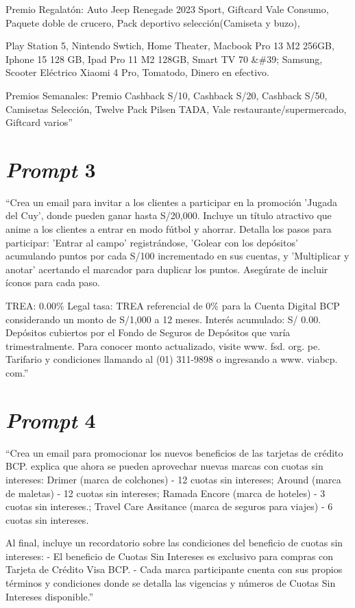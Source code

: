 Premio Regalatón:
Auto Jeep Renegade 2023 Sport,
Giftcard Vale Consumo,
Paquete doble de crucero,
Pack deportivo selección(Camiseta y buzo),

Play Station 5,
Nintendo Swtich,
Home Theater,
Macbook Pro 13 M2 256GB,
Iphone 15 128 GB,
Ipad Pro 11 M2 128GB,
Smart TV 70 \&\#39; Samsung,
Scooter Eléctrico Xiaomi 4 Pro,
Tomatodo,
Dinero en efectivo.

Premios Semanales:
Premio
Cashback S/10,
Cashback S/20,
Cashback S/50,
Camisetas Selección,
Twelve Pack Pilsen TADA,
Vale restaurante/supermercado,
Giftcard varios''


\section{\textit{Prompt} 3}

``Crea un email para invitar a los clientes a participar en la promoción 'Jugada del Cuy', donde pueden ganar hasta S/20,000.  Incluye un título atractivo que anime a los clientes a entrar en modo fútbol y ahorrar. Detalla los pasos para participar: 'Entrar al campo' registrándose, 'Golear con los depósitos' acumulando puntos por cada S/100 incrementado en sus cuentas, y 'Multiplicar y anotar' acertando el marcador para duplicar los puntos. Asegúrate de incluir íconos para cada paso.

TREA: 0.00\%
Legal tasa: TREA referencial de 0\% para la Cuenta Digital BCP considerando un monto de S/1,000 a 12 meses. Interés acumulado: S/ 0.00. Depósitos cubiertos por el Fondo de Seguros de Depósitos que varía trimestralmente. Para conocer monto actualizado, visite www. fsd. org. pe. Tarifario y condiciones llamando al (01) 311-9898 o ingresando a www. viabcp. com.''

\section{\textit{Prompt} 4}

``Crea un email para promocionar los nuevos beneficios de las tarjetas de crédito BCP. explica que ahora se pueden aprovechar nuevas marcas con cuotas sin intereses: Drimer (marca de colchones) - 12 cuotas sin intereses; Around (marca de maletas) - 12 cuotas sin intereses; Ramada Encore (marca de hoteles) - 3 cuotas sin intereses.; Travel Care Assitance (marca de seguros para viajes) - 6 cuotas sin intereses.

Al final, incluye un recordatorio sobre las condiciones del beneficio de cuotas sin intereses:
- El beneficio de Cuotas Sin Intereses es exclusivo para compras con Tarjeta de Crédito Visa BCP.
- Cada marca participante cuenta con sus propios términos y condiciones donde se detalla las vigencias y números de Cuotas Sin Intereses disponible.''

